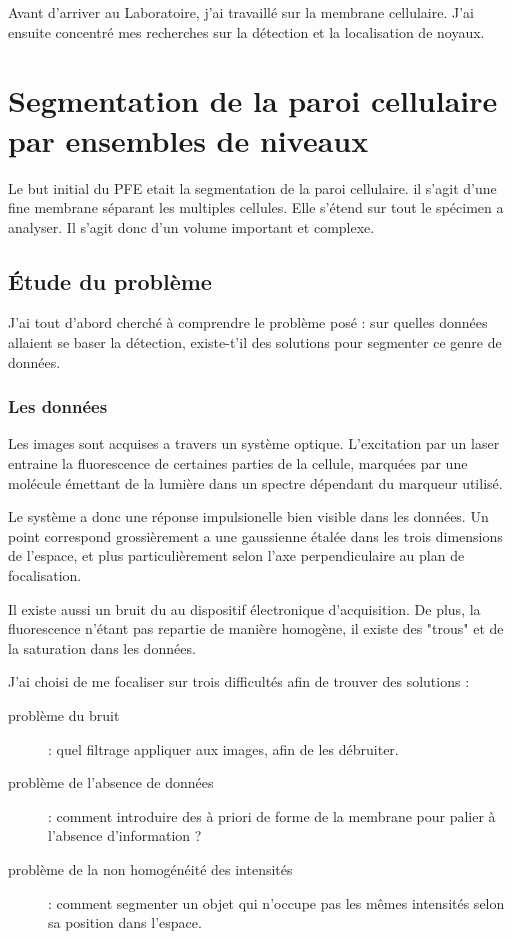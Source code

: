 Avant d'arriver au Laboratoire, j'ai travaillé sur la membrane cellulaire. J'ai ensuite concentré mes recherches sur la détection et la localisation de noyaux.

\section{Segmentation de la paroi cellulaire par ensembles de niveaux}

Le but initial du PFE etait la segmentation de la paroi cellulaire. il s'agit d'une fine membrane séparant les multiples cellules. Elle s'étend sur tout le spécimen a analyser. Il s'agit donc d'un volume important et complexe.

\subsection{Étude du problème}

J'ai tout d'abord cherché à comprendre le problème posé : sur quelles données allaient se baser la détection, existe-t'il des solutions pour segmenter ce genre de données.

\subsubsection{Les données}
Les images sont acquises a travers un système optique. L'excitation par un laser entraine la fluorescence de certaines parties de la cellule, marquées par une molécule émettant de la lumière dans un spectre dépendant du marqueur utilisé.

Le système a donc une réponse impulsionelle bien visible dans les données. Un point correspond grossièrement a une gaussienne étalée dans les trois dimensions de l'espace, et plus particulièrement selon l'axe perpendiculaire au plan de focalisation.

Il existe aussi un bruit du au dispositif électronique d'acquisition. De plus, la fluorescence n'étant pas repartie de manière homogène, il existe des "trous" et de la saturation dans les données.


J'ai choisi de me focaliser sur trois difficultés afin de trouver des solutions :
\begin{description}
  \item [problème du bruit] : quel filtrage appliquer aux images, afin de les débruiter.
  \item [problème de l'absence de données] : comment introduire des à priori de forme de la membrane
  pour palier à l'absence d'information ?
  \item [problème de la non homogénéité des intensités]  : comment segmenter un objet
  qui n'occupe pas les mêmes intensités selon sa position dans l'espace.
\end{description}


